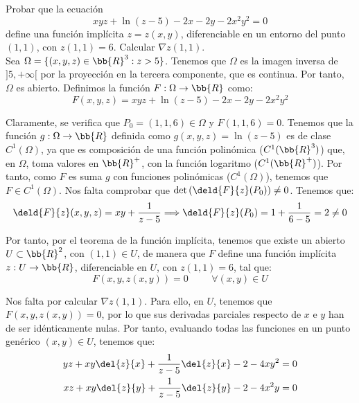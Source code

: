 \begin{ejercicio}
    Probar que la ecuación
    \begin{equation*}
        xyz + \ln(z-5) - 2x - 2y - 2x^2y^2 = 0
    \end{equation*}
    define una función implícita $z = z(x, y)$, diferenciable en un entorno del punto $(1, 1)$,
    con $z(1, 1) = 6$. Calcular $\nabla z(1, 1)$.\\

    Sea $\Omega = \{(x,y,z)\in \bb{R}^3 : z>5\}$. Tenemos que $\Omega$ es la imagen inversa de $]5,+\infty[$ por la proyección en la tercera componente,
    que es continua. Por tanto, $\Omega$ es abierto. Definimos la función $F:\Omega \to \bb{R}$ como:
    \begin{equation*}
        F(x,y,z) = xyz + \ln(z-5) - 2x - 2y - 2x^2y^2
    \end{equation*}

    Claramente, se verifica que $P_0 = (1,1,6)\in \Omega$ y $F(1,1,6)=0$. Tenemos que la función $g:\Omega \to \bb{R}$ definida como $g(x,y,z)=\ln(z-5)$
    es de clase $C^1(\Omega)$, ya que es composición de una función polinómica ($C^1(\bb{R}^3)$)
    que, en $\Omega$, toma valores en $\bb{R}^+$, con la función logaritmo ($C^1(\bb{R}^+)$).
    Por tanto, como $F$ es suma $g$ con funciones polinómicas ($C^1(\Omega)$), tenemos que $F\in C^1(\Omega)$. Nos falta comprobar que
    $\det \left( \deld{F}{z}(P_0) \right) \neq 0$. Tenemos que:
    \begin{equation*}
        \deld{F}{z}(x,y,z) = xy + \frac{1}{z-5} \Longrightarrow
        \deld{F}{z}(P_0) = 1 + \frac{1}{6-5} = 2 \neq 0
    \end{equation*}

    Por tanto, por el teorema de la función implícita,
    tenemos que existe un abierto $U\subset \bb{R}^2$, con $(1,1)\in U$, de manera que $F$
    define una función implícita $z:U\to \bb{R}$, diferenciable en $U$, con $z(1,1)=6$, tal que:
    \begin{equation*}
        F(x,y,z(x,y)) = 0 \hspace{1cm} \forall (x,y)\in U
    \end{equation*}

    Nos falta por calcular $\nabla z(1,1)$. Para ello, en $U$, tenemos que $F(x,y,z(x,y))=0$,
    por lo que sus derivadas parciales respecto de $x$ e $y$ han de ser idénticamente nulas.
    Por tanto, evaluando todas las funciones en un punto genérico $(x,y)\in U$, tenemos que:
    \begin{align*}
        yz + xy\del{z}{x} + \frac{1}{z-5}\del{z}{x} - 2 - 4xy^2 &= 0 \\
        xz + xy\del{z}{y} + \frac{1}{z-5}\del{z}{y} - 2 - 4x^2y &= 0
    \end{align*}


\end{ejercicio}
